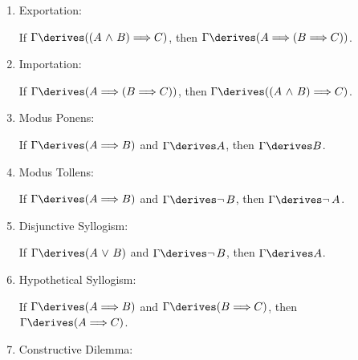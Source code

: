 \begin{enumerate}[topsep=2pt,itemsep=10pt,label=\textup{\texttt{(\arabic*)}}]
        If \( \Gamma \derives \mleft( A {\implies} B \mright) \), then \( \Gamma \derives \mleft( A {\implies} \mleft( A \,\,{\land}\,\, B \mright) \mright) \).

    \item Exportation:  \label{rule-of-inference:exportation}

        If \( \Gamma \derives \mleft( \mleft( A \,\,{\land}\,\, B \mright) {\implies} C \mright) \),
        then \( \Gamma \derives \mleft( A {\implies} \mleft( B {\implies} C \mright) \mright) \).

    \item Importation:  \label{rule-of-inference:importation}

        If \( \Gamma \derives \mleft( A {\implies} \mleft( B {\implies} C \mright) \mright) \), then
        \( \Gamma \derives \mleft( \mleft( A \,\,{\land}\,\, B \mright) {\implies} C \mright) \).

    \item Modus Ponens:  \label{rule-of-inference:modus-ponens}

        If \( \Gamma \derives \mleft( A {\implies} B \mright) \) and \( \Gamma \derives A \), then \( \Gamma \derives B \).

    \item Modus Tollens:  \label{rule-of-inference:modus-tollens}

        If \( \Gamma \derives \mleft( A {\implies} B \mright) \) and \( \Gamma \derives \lnot \, B \), then \( \Gamma \derives \lnot \, A \).

    \item Disjunctive Syllogism:  \label{rule-of-inference:disjunctive-syllogism}

        If \( \Gamma \derives \mleft( A \,\,{\lor}\,\, B \mright) \) and \( \Gamma \derives \lnot \, B \), then \( \Gamma \derives A \).

    \item Hypothetical Syllogism:  \label{rule-of-inference:hypothetical-syllogism}

        If \( \Gamma \derives \mleft( A {\implies} B \mright) \) and \( \Gamma \derives \mleft( B {\implies} C \mright) \), then
        \( \Gamma \derives \mleft( A {\implies} C \mright) \).

    \item Constructive Dilemma:  \label{rule-of-inference:constructive-dilemma}


\end{enumerate}
